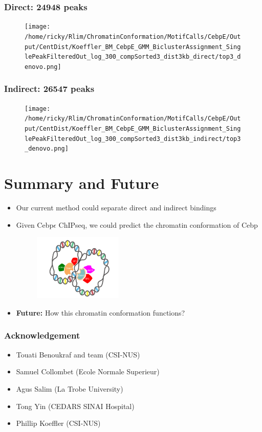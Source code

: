 \documentclass[notes]{beamer}
\begin{document}
\begin{frame}[plain]
    \frametitle{Direct: 24948 peaks}
    \begin{figure}
        \texttt{[image: /home/ricky/Rlim/ChromatinConformation/MotifCalls/CebpE/Output/CentDist/Koeffler\_BM\_CebpE\_GMM\_BiclusterAssignment\_SinglePeakFilteredOut\_log\_300\_compSorted3\_dist3kb\_direct/top3\_denovo.png]}
    \end{figure}
\end{frame}

\begin{frame}[plain]
    \frametitle{Indirect: 26547 peaks}
    \begin{figure}
        \texttt{[image: /home/ricky/Rlim/ChromatinConformation/MotifCalls/CebpE/Output/CentDist/Koeffler\_BM\_CebpE\_GMM\_BiclusterAssignment\_SinglePeakFilteredOut\_log\_300\_compSorted3\_dist3kb\_indirect/top3\_denovo.png]}
    \end{figure}
\end{frame}

\section{Summary and Future}
    \begin{frame}
        \begin{itemize}[<+->]
            \item Our current method could separate direct and indirect bindings 
            \item Given Cebp$\epsilon$ ChIPseq, we could predict the chromatin conformation of Cebp
            \begin{figure}
                \includegraphics[width=0.4\textwidth, height=0.4\textwidth]{../Images/cebpConformation.png}
            \end{figure}
        \item \textbf{Future:} How this chromatin conformation functions?
        \end{itemize}
    \end{frame} 

\begin{frame}[plain]
    \frametitle{Acknowledgement}
    \begin{itemize}
        \item Touati Benoukraf and team (CSI-NUS)
        \item Samuel Collombet (Ecole Normale Superieur)
        \item Agus Salim (La Trobe University)
        \item Tong Yin (CEDARS SINAI Hospital)
        \item Phillip Koeffler (CSI-NUS)
    \end{itemize}
\end{frame}
\end{document}
